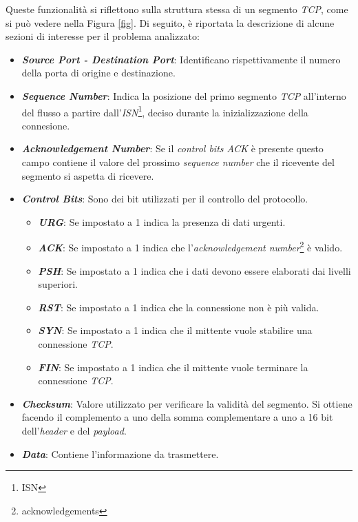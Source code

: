 \noindent Queste funzionalità si riflettono sulla struttura stessa di un segmento \emph{TCP}, come si può vedere nella Figura \ref{fig}. 
Di seguito, è riportata la descrizione di alcune sezioni di interesse per il problema analizzato:

\begin{itemize}
\item \textit{\textbf{Source Port - Destination Port}}: Identificano rispettivamente il numero della porta di origine e destinazione.
\item \textit{\textbf{Sequence Number}}: Indica la posizione del primo segmento \emph{TCP} all'interno del flusso a partire dall'\emph{ISN}\footnote{\gls{ISN}}, deciso durante la inizializzazione della connesione.
\item \textit{\textbf{Acknowledgement Number}}: Se il \emph{control bits ACK} è presente questo campo contiene il valore del prossimo \emph{sequence number} che il ricevente del segmento si aspetta di ricevere.
\item \textit{\textbf{Control Bits}}: Sono dei bit utilizzati per il controllo del protocollo. 
\begin{itemize}
    \item \textit{\textbf{URG}}: Se impostato a 1 indica la presenza di dati urgenti.
    \item \textit{\textbf{ACK}}: Se impostato a 1 indica che l'\emph{acknowledgement number}\footnote{\gls{acknowledgements}} è valido.
    \item \textit{\textbf{PSH}}: Se impostato a 1 indica che i dati devono essere elaborati dai livelli superiori.
    \item \textit{\textbf{RST}}: Se impostato a 1 indica che la connessione non è più valida.
    \item \textit{\textbf{SYN}}: Se impostato a 1 indica che il mittente vuole stabilire una connessione \emph{TCP}.
    \item \textit{\textbf{FIN}}: Se impostato a 1 indica che il mittente vuole terminare la connessione \emph{TCP}.
\end{itemize}
\item \textit{\textbf{Checksum}}: Valore utilizzato per verificare la validità del segmento. Si ottiene facendo il complemento a uno della somma complementare a uno a 16 bit dell'\emph{header} e del \emph{payload}.
\item \textit{\textbf{Data}}: Contiene l'informazione da trasmettere.
\end{itemize}

